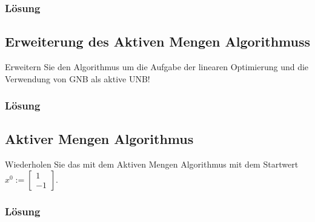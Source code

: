 \subsubsection{Lösung}
 
\subsection*{Erweiterung des Aktiven Mengen Algorithmuss}
\label{sec:uebung_erweiterung_algo} 
Erweitern Sie den Algorithmus um die Aufgabe der linearen Optimierung und die Verwendung von GNB als aktive UNB!

\subsubsection{Lösung} 

\subsection*{Aktiver Mengen Algorithmus}
\label{sec:uebung_ama} 
Wiederholen Sie das  mit dem Aktiven Mengen Algorithmus mit dem Startwert $x^0:=\begin{bmatrix}
1\\ -1
\end{bmatrix}$.
\subsubsection{Lösung} 


